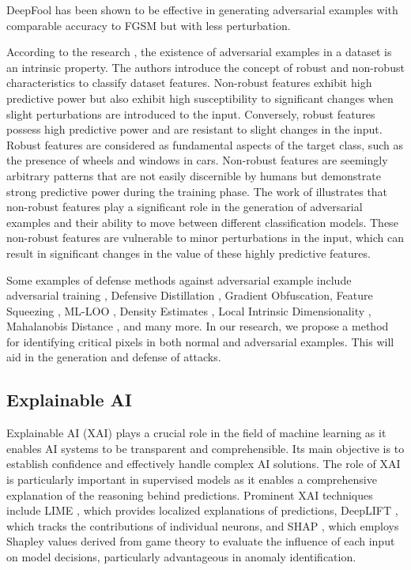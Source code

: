 \documentclass[10pt, conference, a4paper, final]{IEEEtran}
\begin{document}
DeepFool has been shown to be effective in generating adversarial examples with comparable accuracy to FGSM but with less perturbation.

According to the research \cite {Ilyas.}, the existence of adversarial examples in a dataset is an intrinsic property. The authors introduce the concept of robust and non-robust characteristics to classify dataset features. Non-robust features exhibit high predictive power but also exhibit high susceptibility to significant changes when slight perturbations are introduced to the input. Conversely, robust features possess high predictive power and are resistant to slight changes in the input. Robust features are considered as fundamental aspects of the target class, such as the presence of wheels and windows in cars. Non-robust features are seemingly arbitrary patterns that are not easily discernible by humans but demonstrate strong predictive power during the training phase. The work of \cite {Ilyas.} illustrates that non-robust features play a significant role in the generation of adversarial examples and their ability to move between different classification models. These non-robust features are vulnerable to minor perturbations in the input, which can result in significant changes in the value of these highly predictive features.

Some examples of defense methods against adversarial example include adversarial training \cite {Goodfellow.}, Defensive Distillation \cite {Papernot}, Gradient Obfuscation, Feature Squeezing \cite {Evans}, ML-LOO \cite {Yang}, Density Estimates \cite {Feinman}, Local Intrinsic Dimensionality \cite {Ma}, Mahalanobis Distance 
 \cite {Lee}, and many more. In our research, we propose a method for identifying critical pixels in both normal and adversarial examples. This will aid in the generation and defense of attacks. 


\subsection{Explainable AI}

Explainable AI (XAI) plays a crucial role in the field of machine learning as it enables AI systems to be transparent and comprehensible. Its main objective is to establish confidence and effectively handle complex AI solutions. The role of XAI is particularly important in supervised models as it enables a comprehensive explanation of the reasoning behind predictions. Prominent XAI techniques include LIME \cite {Ribeiro}, which provides localized explanations of predictions, DeepLIFT \cite {Shrikumar}, which tracks the contributions of individual neurons, and SHAP \cite {LundbergandS}, which employs Shapley values derived from game theory to evaluate the influence of each input on model decisions, particularly advantageous in anomaly identification.
\end{document}
